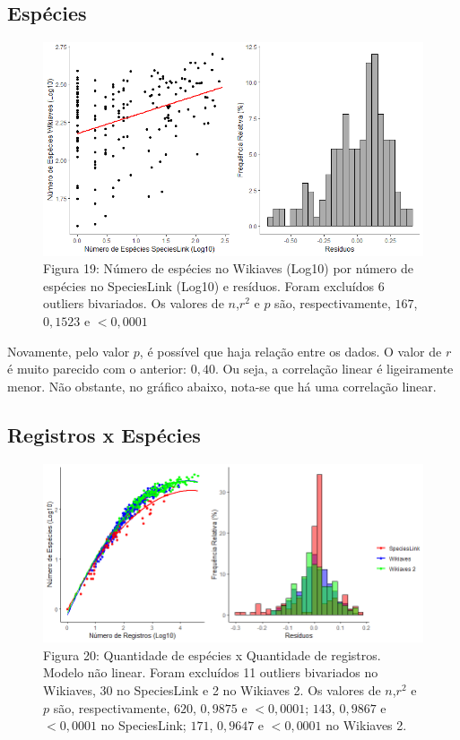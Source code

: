 \documentclass[12pt]{extarticle}
\newenvironment{resposta}{ \color{mygray}}{}
\begin{document}
\subsection{Espécies}

\begin{figure}[h!]
\centering
\includegraphics[width = 12cm]{Imagens/G12.png}
\\{\scriptsize Figura 19: Número de espécies no Wikiaves (Log10) por número de espécies no SpeciesLink (Log10) e resíduos. Foram excluídos 6 outliers bivariados. Os valores de $n$,$r^2$ e $p$ são, respectivamente, $167$, $0,1523$ e $<0,0001$}
\end{figure}

\begin{resposta}
Novamente, pelo valor $p$, é possível que haja relação entre os dados. O valor de $r$ é muito parecido com o anterior: $0,40$. Ou seja, a correlação linear é ligeiramente menor. Não obstante, no gráfico abaixo, nota-se que há uma correlação linear. 

\end{resposta}

\subsection {Registros x Espécies}

\begin{figure}[h!]
\centering
\includegraphics[width = 15cm]{Imagens/G13.png}
\\{\scriptsize Figura 20: Quantidade de espécies x Quantidade de registros. Modelo não linear. Foram excluídos 11 outliers bivariados no Wikiaves, 30 no SpeciesLink e 2 no Wikiaves 2.  Os valores de $n$,$r^2$ e $p$ são, respectivamente, $620$, $0,9875$ e $<0,0001$; $143$, $0,9867$ e $<0,0001$ no SpeciesLink; $171$, $0,9647$ e $<0,0001$ no Wikiaves 2. }
\label{Figura 20}
\end{figure}
\end{document}
